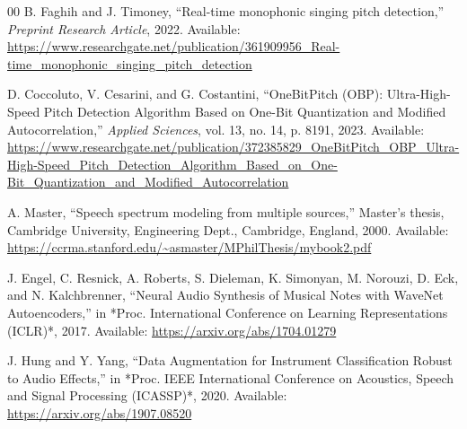 \documentclass{ieeeaccess}
\begin{document}
\begin{thebibliography}{00}
 B. Faghih and J. Timoney, ``Real-time monophonic singing pitch detection,'' \emph{Preprint Research Article}, 2022.
Available: \url{https://www.researchgate.net/publication/361909956_Real-time_monophonic_singing_pitch_detection}

 D. Coccoluto, V. Cesarini, and G. Costantini, ``OneBitPitch (OBP): Ultra-High-Speed Pitch Detection Algorithm Based on One-Bit Quantization and Modified Autocorrelation,'' \emph{Applied Sciences}, vol. 13, no. 14, p. 8191, 2023.
Available: \url{https://www.researchgate.net/publication/372385829_OneBitPitch_OBP_Ultra-High-Speed_Pitch_Detection_Algorithm_Based_on_One-Bit_Quantization_and_Modified_Autocorrelation}

 A. Master, ``Speech spectrum modeling from multiple sources,'' Master’s thesis, Cambridge University, Engineering Dept., Cambridge, England, 2000.
Available: \url{https://ccrma.stanford.edu/~asmaster/MPhilThesis/mybook2.pdf}

 J. Engel, C. Resnick, A. Roberts, S. Dieleman, K. Simonyan, M. Norouzi, D. Eck, and N. Kalchbrenner, 
``Neural Audio Synthesis of Musical Notes with WaveNet Autoencoders,'' 
in *Proc. International Conference on Learning Representations (ICLR)*, 2017. 
Available: \url{https://arxiv.org/abs/1704.01279}

 J. Hung and Y. Yang, 
``Data Augmentation for Instrument Classification Robust to Audio Effects,'' 
in *Proc. IEEE International Conference on Acoustics, Speech and Signal Processing (ICASSP)*, 2020. 
Available: \url{https://arxiv.org/abs/1907.08520}

\end{thebibliography}

\end{document}

